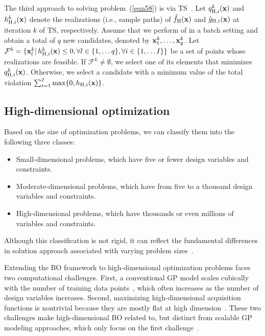 \documentclass[journal ]{new-aiaa}
\begin{document}
The third approach to solving problem~(\ref{eqn58}) is via TS~\citep{Eriksson2021}.
Let $q^k_{\text{H},i}({\bf x})$ and $h^k_{\text{H},i}({\bf x})$ denote the realizations (i.e., sample paths) of $\hat{f}_{\text{H}}({\bf x})$ and $\hat{g}_{\text{H},i}({\bf x})$ at iteration $k$ of TS, respectively.
Assume that we perform  of  in a batch setting and obtain a total of $q$ new candidates, denoted by ${\bf x}^k_1,\dots, {\bf x}^k_q$.
Let $\mathcal{F}^k = \{{\bf x}^k_l|\,h^k_{\text{H},i}({\bf x}) \leq 0,\forall l \in \{1,\dots q\}, \forall i \in \{1,\dots I\}\}$ be a set of points whose realizations are feasible.
If $\mathcal{F}^k \neq \emptyset$, we select one of its elements that minimizes $q^k_{\text{H},i}({\bf x})$.
Otherwise, we select a candidate with a minimum value of the total violation
$\sum_{i=1}^{I} \max\{0,h_{\text{H},i}({\bf x})\}$.

\subsection{High-dimensional optimization}\label{Sec62}

Based on the size of optimization problems, we can classify them into the following three classes: 
\begin{itemize}
	\item Small-dimensional problems, which have five or fewer design variables and constraints.
	
	\item Moderate-dimensional problems, which have from five to a thousand design variables and constraints.
	
	\item High-dimensional problems, which have thousands or even millions of variables and constraints.
\end{itemize}
Although this classification is not rigid, it can reflect the fundamental differences in solution approach associated with varying problem sizes~\citep{Luenberger2008}.

Extending the BO framework to high-dimensional optimization problems faces two computational challenges.
First, a conventional GP model scales cubically with the number of training data points~\citep{Rasmussen2006}, which often increases as the number of design variables increases.
Second, maximizing high-dimensional acquisition functions is nontrivial because they are mostly flat at high dimension~\citep{Rana2017}.
These two challenges make high-dimensional BO related to, but distinct from scalable GP modeling approaches, which only focus on the first challenge~\citep{LiuH2020}. 
\end{document}
